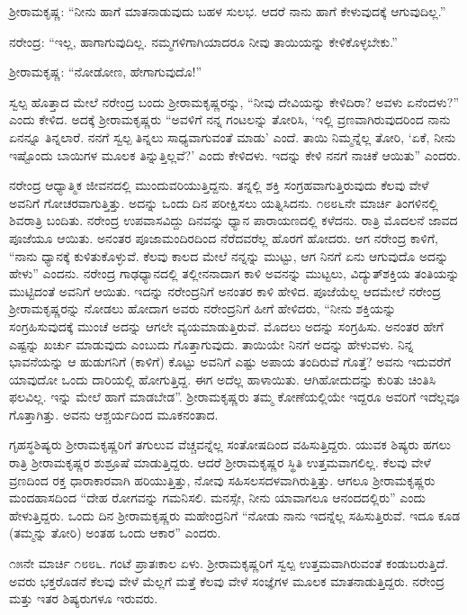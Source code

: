 ಶ‍್ರೀರಾಮಕೃಷ್ಣ: “ನೀನು ಹಾಗೆ ಮಾತನಾಡುವುದು ಬಹಳ ಸುಲಭ. ಆದರೆ ನಾನು ಹಾಗೆ ಕೇಳುವುದಕ್ಕೆ ಆಗುವುದಿಲ್ಲ.”

ನರೇಂದ್ರ: “ಇಲ್ಲ, ಹಾಗಾಗುವುದಿಲ್ಲ. ನಮ್ಮಗಳಿಗಾಗಿಯಾದರೂ ನೀವು ತಾಯಿಯನ್ನು ಕೇಳಿಕೊಳ್ಳಬೇಕು.”

ಶ‍್ರೀರಾಮಕೃಷ್ಣ: “ನೋಡೋಣ, ಹೇಗಾಗುವುದೊ!”

ಸ್ವಲ್ಪ ಹೊತ್ತಾದ ಮೇಲೆ ನರೇಂದ್ರ ಬಂದು ಶ‍್ರೀರಾಮಕೃಷ್ಣರನ್ನು, “ನೀವು ದೇವಿಯನ್ನು ಕೇಳಿದಿರಾ? ಅವಳು ಏನೆಂದಳು?” ಎಂದು ಕೇಳಿದ. ಅದಕ್ಕೆ ಶ‍್ರೀರಾಮಕೃಷ್ಣರು “ಅವಳಿಗೆ ನನ್ನ ಗಂಟಲನ್ನು ತೋರಿಸಿ, ‘ಇಲ್ಲಿ ವ್ರಣವಾಗಿರುವುದರಿಂದ ನಾನು ಏನನ್ನೂ ತಿನ್ನಲಾರೆ. ನನಗೆ ಸ್ವಲ್ಪ ತಿನ್ನಲು ಸಾಧ್ಯವಾಗುವಂತೆ ಮಾಡು’ ಎಂದೆ. ತಾಯಿ ನಿಮ್ಮನ್ನೆಲ್ಲ ತೋರಿ, ‘ಏಕೆ, ನೀನು ಇಷ್ಟೊಂದು ಬಾಯಿಗಳ ಮೂಲಕ ತಿನ್ನುತ್ತಿಲ್ಲವೆ?’ ಎಂದು ಕೇಳಿದಳು. ಇದನ್ನು ಕೇಳಿ ನನಗೆ ನಾಚಿಕೆ ಆಯಿತು” ಎಂದರು.

ನರೇಂದ್ರ ಆಧ್ಯಾತ್ಮಿಕ ಜೀವನದಲ್ಲಿ ಮುಂದುವರಿಯುತ್ತಿದ್ದನು. ತನ್ನಲ್ಲಿ ಶಕ್ತಿ ಸಂಗ್ರಹವಾಗುತ್ತಿರುವುದು ಕೆಲವು ವೇಳೆ ಅವನಿಗೆ ಗೋಚರವಾಗುತ್ತಿತ್ತು. ಅದನ್ನು ಒಂದು ದಿನ ಪರೀಕ್ಷಿಸಲು ಯತ್ನಿಸಿದನು. ೧೮೮೬ನೇ ಮಾರ್ಚಿ ತಿಂಗಳಿನಲ್ಲಿ ಶಿವರಾತ್ರಿ ಬಂದಿತು. ನರೇಂದ್ರ ಉಪವಾಸವಿದ್ದು ದಿನವನ್ನು ಧ್ಯಾನ ಪಾರಾಯಣದಲ್ಲಿ ಕಳೆದನು. ರಾತ್ರಿ ಮೊದಲನೆ ಜಾವದ ಪೂಜೆಯೂ ಆಯಿತು. ಅನಂತರ ಪೂಜಾಮಂದಿರದಿಂದ ನೆರೆದವರೆಲ್ಲ ಹೊರಗೆ ಹೋದರು. ಆಗ ನರೇಂದ್ರ ಕಾಳಿಗೆ, “ನಾನು ಧ್ಯಾನಕ್ಕೆ ಕುಳಿತುಕೊಳ್ಳುವೆ. ಕೆಲವು ಕಾಲದ ಮೇಲೆ ನನ್ನನ್ನು ಮುಟ್ಟು, ಆಗ ನಿನಗೆ ಏನು ಆಗುವುದೊ ಅದನ್ನು ಹೇಳು” ಎಂದನು. ನರೇಂದ್ರ ಗಾಢಧ್ಯಾನದಲ್ಲಿ ತಲ್ಲೀನನಾದಾಗ ಕಾಳಿ ಅವನನ್ನು ಮುಟ್ಟಲು, ವಿದ್ಯುತ್‍ಶಕ್ತಿಯ ತಂತಿಯನ್ನು ಮುಟ್ಟಿದಂತೆ ಅವನಿಗೆ ಆಯಿತು. ಇದನ್ನು ನರೇಂದ್ರನಿಗೆ ಅನಂತರ ಕಾಳಿ ಹೇಳಿದ. ಪೂಜೆಯೆಲ್ಲ ಆದಮೇಲೆ ನರೇಂದ್ರ ಶ‍್ರೀರಾಮಕೃಷ್ಣರನ್ನು ನೋಡಲು ಹೋದಾಗ ಅವರು ನರೇಂದ್ರನಿಗೆ ಹೀಗೆ ಹೇಳಿದರು, “ನೀನು ಶಕ್ತಿಯನ್ನು ಸಂಗ್ರಹಿಸುವುದಕ್ಕೆ ಮುಂಚೆ ಅದನ್ನು ಆಗಲೇ ವ್ಯಯಮಾಡುತ್ತಿರುವೆ. ಮೊದಲು ಅದನ್ನು ಸಂಗ್ರಹಿಸು. ಅನಂತರ ಹೇಗೆ ಎಷ್ಟನ್ನು ಖರ್ಚು ಮಾಡುವುದು ಎಂಬುದು ಗೊತ್ತಾಗುವುದು. ತಾಯಿಯೇ ನಿನಗೆ ಅದನ್ನು ಹೇಳುವಳು. ನಿನ್ನ ಭಾವನೆಯನ್ನು ಆ ಹುಡುಗನಿಗೆ (ಕಾಳಿಗೆ) ಕೊಟ್ಟು ಅವನಿಗೆ ಎಷ್ಟು ಅಪಾಯ ತಂದಿರುವೆ ಗೊತ್ತೆ? ಅವನು ಇದುವರೆಗೆ ಯಾವುದೋ ಒಂದು ದಾರಿಯಲ್ಲಿ ಹೋಗುತ್ತಿದ್ದ. ಈಗ ಅದೆಲ್ಲ ಹಾಳಾಯಿತು. ಆಗಿಹೋದುದನ್ನು ಕುರಿತು ಚಿಂತಿಸಿ ಫಲವಿಲ್ಲ. ಇನ್ನು ಮೇಲೆ ಹಾಗೆ ಮಾಡಬೇಡ”. ಶ‍್ರೀರಾಮಕೃಷ್ಣರು ತಮ್ಮ ಕೋಣೆಯಲ್ಲಿಯೇ ಇದ್ದರೂ ಅವರಿಗೆ ಇದೆಲ್ಲವೂ ಗೊತ್ತಾಗಿತ್ತು. ಅವನು ಆಶ್ಚರ್ಯದಿಂದ ಮೂಕನಂತಾದ.

ಗೃಹಸ್ಥಶಿಷ್ಯರು ಶ‍್ರೀರಾಮಕೃಷ್ಣರಿಗೆ ತಗುಲುವ ವೆಚ್ಚವನ್ನೆಲ್ಲ ಸಂತೋಷದಿಂದ ವಹಿಸುತ್ತಿದ್ದರು. ಯುವಕ ಶಿಷ್ಯರು ಹಗಲು ರಾತ್ರಿ ಶ‍್ರೀರಾಮಕೃಷ್ಣರ ಶುಶ್ರೂಷೆ ಮಾಡುತ್ತಿದ್ದರು. ಆದರೆ ಶ‍್ರೀರಾಮಕೃಷ್ಣರ ಸ್ಥಿತಿ ಉತ್ತಮವಾಗಲಿಲ್ಲ. ಕೆಲವು ವೇಳೆ ವ್ರಣದಿಂದ ರಕ್ತ ಧಾರಾಕಾರವಾಗಿ ಹರಿಯುತ್ತಿತ್ತು, ನೋವು ಸಹಿಸಲಸದಳವಾಗಿರುತ್ತಿತ್ತು. ಆಗಲೂ ಶ‍್ರೀರಾಮಕೃಷ್ಣರು ಮಂದಹಾಸದಿಂದ “ದೇಹ ರೋಗವನ್ನು ಗಮನಿಸಲಿ. ಮನಸ್ಸೇ, ನೀನು ಯಾವಾಗಲೂ ಆನಂದದಲ್ಲಿರು” ಎಂದು ಹೇಳುತ್ತಿದ್ದರು. ಒಂದು ದಿನ ಶ‍್ರೀರಾಮಕೃಷ್ಣರು ಮಹೇಂದ್ರನಿಗೆ “ನೋಡು ನಾನು ಇದನ್ನೆಲ್ಲ ಸಹಿಸುತ್ತಿರುವೆ. ಇದೂ ಕೂಡ (ತಮ್ಮನ್ನು ತೋರಿ) ಅಂತಹ ಒಂದು ಆಕಾರ” ಎಂದರು.

೧೫ನೇ ಮಾರ್ಚಿ ೧೮೮೬. ಗಂಟೆ ಪ್ರಾತಃಕಾಲ ಏಳು. ಶ‍್ರೀರಾಮಕೃಷ್ಣರಿಗೆ ಸ್ವಲ್ಪ ಉತ್ತಮವಾಗಿರುವಂತೆ ಕಂಡುಬರುತ್ತಿದೆ. ಅವರು ಭಕ್ತರೊಡನೆ ಕೆಲವು ವೇಳೆ ಮೆಲ್ಲಗೆ ಮತ್ತೆ ಕೆಲವು ವೇಳೆ ಸಂಜ್ಞೆಗಳ ಮೂಲಕ ಮಾತನಾಡುತ್ತಿದ್ದರು. ನರೇಂದ್ರ ಮತ್ತು ಇತರ ಶಿಷ್ಯರುಗಳೂ ಇರುವರು.

